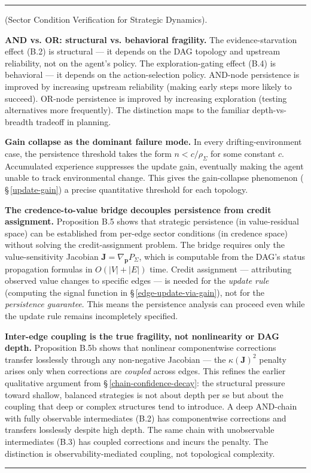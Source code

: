 \documentclass[11pt,oneside]{article}
\newcounter{claim}[section]
\renewcommand{\theclaim}{\thesection.\arabic{claim}}
\newenvironment{segment}[2]{%
  \refstepcounter{claim}%
  \bigskip\noindent\hrule\smallskip
  \noindent{\bfseries #1~\theclaim}\enskip(#2).\par\smallskip
  \noindent\ignorespaces
}{%
  \par\smallskip\noindent\hrule\bigskip
}
\newenvironment{derivation}[1][]{\begin{segment}{Derivation}{#1}}{\end{segment}}
\begin{document}
\begin{derivation}[Sector Condition Verification for Strategic Dynamics]
\textbf{AND vs. OR: structural vs. behavioral fragility.} The evidence-starvation effect (B.2) is structural --- it depends on the DAG topology and upstream reliability, not on the agent's policy. The exploration-gating effect (B.4) is behavioral --- it depends on the action-selection policy. AND-node persistence is improved by increasing upstream reliability (making early steps more likely to succeed). OR-node persistence is improved by increasing exploration (testing alternatives more frequently). The distinction maps to the familiar depth-vs-breadth tradeoff in planning.

\textbf{Gain collapse as the dominant failure mode.} In every drifting-environment case, the persistence threshold takes the form $n < c/\rho_\Sigma$ for some constant $c$. Accumulated experience suppresses the update gain, eventually making the agent unable to track environmental change. This gives the gain-collapse phenomenon ( \S\,\ref{update-gain}) a precise quantitative threshold for each topology.

\textbf{The credence-to-value bridge decouples persistence from credit assignment.} Proposition B.5 shows that strategic persistence (in value-residual space) can be established from per-edge sector conditions (in credence space) without solving the credit-assignment problem. The bridge requires only the value-sensitivity Jacobian $\mathbf{J} = \nabla_\mathbf{p} P_\Sigma$, which is computable from the DAG's status propagation formulas in $O(\lvert V\rvert + \lvert E\rvert)$ time. Credit assignment — attributing observed value changes to specific edges — is needed for the \textit{update rule} (computing the signal function in \S\,\ref{edge-update-via-gain}), not for the \textit{persistence guarantee}. This means the persistence analysis can proceed even while the update rule remains incompletely specified.

\textbf{Inter-edge coupling is the true fragility, not nonlinearity or DAG depth.} Proposition B.5b shows that nonlinear componentwise corrections transfer losslessly through any non-negative Jacobian — the $\kappa(\mathbf{J})^2$ penalty arises only when corrections are \textit{coupled} across edges. This refines the earlier qualitative argument from \S\,\ref{chain-confidence-decay}: the structural pressure toward shallow, balanced strategies is not about depth per se but about the coupling that deep or complex structures tend to introduce. A deep AND-chain with fully observable intermediates (B.2) has componentwise corrections and transfers losslessly despite high depth. The same chain with unobservable intermediates (B.3) has coupled corrections and incurs the penalty. The distinction is observability-mediated coupling, not topological complexity.

\end{derivation}
\end{document}
